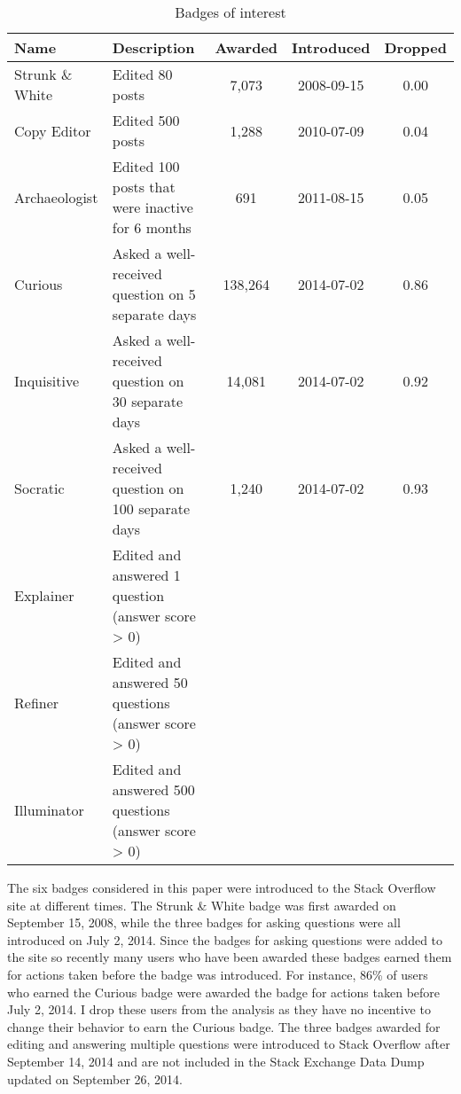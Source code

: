 \begin{table}
  \begin{threeparttable}
    \caption{Badges of interest}
    \label{tab:badges}
    \begin{tabular}{@{}llccc@{}}
      \toprule
      Name & Description & Awarded & Introduced & Dropped \\
      \midrule
      Strunk \& White & Edited 80 posts & 7,073 & 2008-09-15 & 0.00 \\
      Copy Editor & Edited 500 posts & 1,288 & 2010-07-09 & 0.04 \\
      Archaeologist & Edited 100 posts that were inactive for 6 months & 691 & 2011-08-15 & 0.05 \\
      \midrule
      Curious & Asked a well-received question on 5 separate days\footnotemark & 138,264 & 2014-07-02 & 0.86 \\
      Inquisitive & Asked a well-received question on 30 separate days & 14,081 & 2014-07-02 & 0.92 \\
      Socratic & Asked a well-received question on 100 separate days & 1,240 & 2014-07-02 & 0.93 \\
      \midrule
      Explainer & Edited and answered 1 question (answer score > 0) & & \\
      Refiner & Edited and answered 50 questions (answer score > 0) & & \\
      Illuminator & Edited and answered 500 questions (answer score > 0) & & \\
      \bottomrule
    \end{tabular}
    \begin{tablenotes}
    \item The six badges considered in this paper were introduced to the Stack Overflow site at different times. The Strunk \& White badge was first awarded on September 15, 2008, while the three badges for asking questions were all introduced on July 2, 2014. Since the badges for asking questions were added to the site so recently many users who have been awarded these badges earned them for actions taken before the badge was introduced. For instance, 86\% of users who earned the Curious badge were awarded the badge for actions taken before July 2, 2014. I drop these users from the analysis as they have no incentive to change their behavior to earn the Curious badge. The three badges awarded for editing and answering multiple questions were introduced to Stack Overflow after September 14, 2014 and are not included in the Stack Exchange Data Dump updated on September 26, 2014.
    \end{tablenotes}
  \end{threeparttable}
\end{table}
